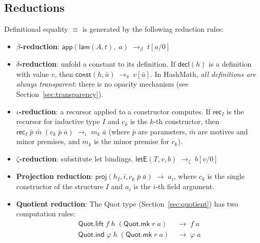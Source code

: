 \documentclass[11pt]{article}
\theoremstyle{definition}
\theoremstyle{plain}
\theoremstyle{remark}
\newcommand{\const}{\textsf{const}}
\newcommand{\app}{\textsf{app}}
\newcommand{\lam}{\textsf{lam}}
\newcommand{\letE}{\textsf{letE}}
\newcommand{\proj}{\textsf{proj}}
\newcommand{\Quot}{\textsf{Quot}}
\begin{document}
\subsection{Reductions}
\label{sec:reductions}

Definitional equality $\equiv$ is generated by the following reduction rules:

\begin{itemize}[nosep]
  \item \textbf{$\beta$-reduction}: $\app(\lam(A, t),\; a) \;\longrightarrow_\beta\; t[a/0]$

  \item \textbf{$\delta$-reduction}: unfold a constant to its definition.
        If $\textsf{decl}(h)$ is a definition with value $v$, then $\const(h, \bar{u}) \;\longrightarrow_\delta\; v[\bar{u}]$.
        In HashMath, \emph{all definitions are always transparent}: there is no opacity mechanism (see Section~\ref{sec:transparency}).

  \item \textbf{$\iota$-reduction}: a recursor applied to a constructor computes.
        If $\textsf{rec}_I$ is the recursor for inductive type $I$ and $c_k$ is the $k$-th constructor,
        then $\textsf{rec}_I \; \bar{p} \; \bar{m} \; (c_k \; \bar{p} \; \bar{a}) \;\longrightarrow_\iota\; m_k \; \bar{a}$
        (where $\bar{p}$ are parameters, $\bar{m}$ are motives and minor premises, and $m_k$ is the minor premise for $c_k$).

  \item \textbf{$\zeta$-reduction}: substitute let bindings.
        $\letE(T, v, b) \;\longrightarrow_\zeta\; b[v/0]$

  \item \textbf{Projection reduction}: $\proj(h_I, i, c_k \; \bar{p} \; \bar{a}) \;\longrightarrow\; a_i$,
        where $c_k$ is the single constructor of the structure $I$ and $a_i$ is the $i$-th field argument.

  \item \textbf{Quotient reduction}: The Quot type (Section~\ref{sec:quotient}) has two computation rules:
        \begin{align*}
          \Quot.\textsf{lift}\; f\; h\; (\Quot.\textsf{mk}\; r\; a) &\;\longrightarrow\; f\; a \\
          \Quot.\textsf{ind}\; \varphi\; h\; (\Quot.\textsf{mk}\; r\; a) &\;\longrightarrow\; \varphi\; a
        \end{align*}
\end{itemize}
\end{document}

